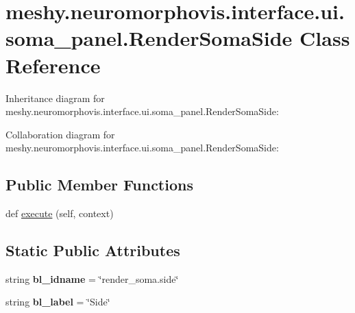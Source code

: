 \hypertarget{classmeshy_1_1neuromorphovis_1_1interface_1_1ui_1_1soma__panel_1_1RenderSomaSide}{}\section{meshy.\+neuromorphovis.\+interface.\+ui.\+soma\+\_\+panel.\+Render\+Soma\+Side Class Reference}
\label{classmeshy_1_1neuromorphovis_1_1interface_1_1ui_1_1soma__panel_1_1RenderSomaSide}


Inheritance diagram for meshy.\+neuromorphovis.\+interface.\+ui.\+soma\+\_\+panel.\+Render\+Soma\+Side\+:


Collaboration diagram for meshy.\+neuromorphovis.\+interface.\+ui.\+soma\+\_\+panel.\+Render\+Soma\+Side\+:
\subsection*{Public Member Functions}
\begin{DoxyCompactItemize}
\item 
def \hyperlink{classmeshy_1_1neuromorphovis_1_1interface_1_1ui_1_1soma__panel_1_1RenderSomaSide_ab0c532b5e78e8c3531e081a7565bab02}{execute} (self, context)
\end{DoxyCompactItemize}
\subsection*{Static Public Attributes}
\begin{DoxyCompactItemize}
\item 
string {\bfseries bl\+\_\+idname} = \char`\"{}render\+\_\+soma.\+side\char`\"{}\hypertarget{classmeshy_1_1neuromorphovis_1_1interface_1_1ui_1_1soma__panel_1_1RenderSomaSide_a53e31383f05e6f905cf9f08833e2b997}{}\label{classmeshy_1_1neuromorphovis_1_1interface_1_1ui_1_1soma__panel_1_1RenderSomaSide_a53e31383f05e6f905cf9f08833e2b997}

\item 
string {\bfseries bl\+\_\+label} = \char`\"{}Side\char`\"{}\hypertarget{classmeshy_1_1neuromorphovis_1_1interface_1_1ui_1_1soma__panel_1_1RenderSomaSide_a7916039ef4b29199ff130ba1807fa837}{}\label{classmeshy_1_1neuromorphovis_1_1interface_1_1ui_1_1soma__panel_1_1RenderSomaSide_a7916039ef4b29199ff130ba1807fa837}

\end{DoxyCompactItemize}


